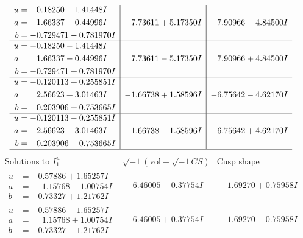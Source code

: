 \documentclass[1p]{elsarticle_modified}
\theoremstyle{definition}
\newcommand{\I}{\sqrt{-1}}
\begin{document}
$$\begin{array}{c|c|c}
\begin{aligned}
u &= -0.18250 + 1.41448 I \\
a &= \phantom{-}1.66337 + 0.44996 I \\
b &= -0.729471 - 0.781970 I\end{aligned}
 & \phantom{-}7.73611 + 5.17350 I & \phantom{-}7.90966 - 4.84500 I \\ \hline\begin{aligned}
u &= -0.18250 - 1.41448 I \\
a &= \phantom{-}1.66337 - 0.44996 I \\
b &= -0.729471 + 0.781970 I\end{aligned}
 & \phantom{-}7.73611 - 5.17350 I & \phantom{-}7.90966 + 4.84500 I \\ \hline\begin{aligned}
u &= -0.120113 + 0.255851 I \\
a &= \phantom{-}2.56623 + 3.01463 I \\
b &= \phantom{-}0.203906 + 0.753665 I\end{aligned}
 & -1.66738 + 1.58596 I & -6.75642 - 4.62170 I \\ \hline\begin{aligned}
u &= -0.120113 - 0.255851 I \\
a &= \phantom{-}2.56623 - 3.01463 I \\
b &= \phantom{-}0.203906 - 0.753665 I\end{aligned}
 & -1.66738 - 1.58596 I & -6.75642 + 4.62170 I\\
 \hline 
 \end{array}$$\newpage$$\begin{array}{c|c|c}  
\text{Solutions to }I^u_{1}& \I (\text{vol} + \sqrt{-1}CS) & \text{Cusp shape}\\
 \hline 
\begin{aligned}
u &= -0.57886 + 1.65257 I \\
a &= \phantom{-}1.15768 - 1.00754 I \\
b &= -0.73327 + 1.21762 I\end{aligned}
 & \phantom{-}6.46005 - 0.37754 I & \phantom{-}1.69270 + 0.75958 I \\ \hline\begin{aligned}
u &= -0.57886 - 1.65257 I \\
a &= \phantom{-}1.15768 + 1.00754 I \\
b &= -0.73327 - 1.21762 I\end{aligned}
 & \phantom{-}6.46005 + 0.37754 I & \phantom{-}1.69270 - 0.75958 I \\ \hline\begin{aligned}

\end{aligned}
\end{array}$$
\end{document}
